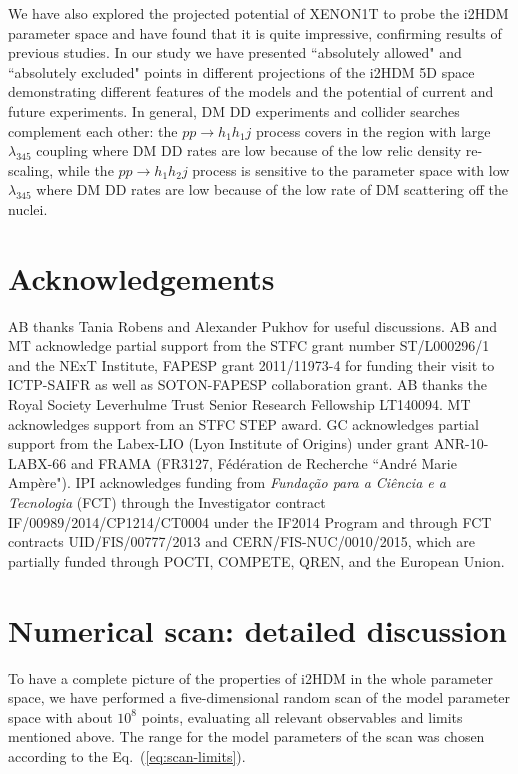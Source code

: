 \documentclass[12pt,a4paper]{article}
\begin{document}
We have also explored the projected potential of XENON1T to probe the i2HDM
parameter space and have found that it is quite impressive,
confirming results of previous studies.
In our study we have presented  ``absolutely allowed"  and ``absolutely excluded" points
in different projections of the i2HDM 5D space demonstrating different features of the models
and the potential of current and future experiments.
In general, DM DD experiments and collider searches complement each other:
the $pp\to h_1 h_1j$ process covers in the region with large $\lambda_{345}$ coupling
where DM DD rates are low because of the low relic density re-scaling,
while the $pp\to h_1 h_2j$ process is sensitive to the parameter space with low $\lambda_{345}$
where DM DD rates are low because of the low rate of DM scattering off the nuclei.

\section*{Acknowledgements}

AB thanks Tania Robens and Alexander Pukhov for useful discussions.
AB and MT acknowledge partial support from the STFC grant number  ST/L000296/1
and the NExT Institute, FAPESP grant 2011/11973-4 for funding their visit to ICTP-SAIFR as well as SOTON-FAPESP collaboration grant.
AB thanks the Royal Society Leverhulme Trust Senior Research Fellowship LT140094.
MT acknowledges support from an STFC STEP award. 
GC acknowledges partial support from the Labex-LIO (Lyon Institute of Origins) under grant ANR-10-LABX-66 and FRAMA (FR3127, F\'ed\'eration de Recherche ``Andr\'e Marie Amp\`ere").
IPI acknowledges funding from \textit{Fun\-da\-\c{c}\~{a}o para a Ci\^{e}ncia e a Tecnologia} (FCT)
through the Investigator contract IF/00989/2014/CP1214/CT0004
under the IF2014 Program and through FCT contracts UID/FIS/00777/2013 and CERN/FIS-NUC/0010/2015,
which are partially funded through POCTI, COMPETE, QREN, and the European Union. 

\appendix

\section{Numerical scan: detailed discussion} \label{app:numerical}

To have a complete picture of the properties of i2HDM in the whole parameter space, we have performed a
five-dimensional random scan of the model parameter space with about $10^8$ points, evaluating all relevant
observables and limits mentioned above. The range for 
the model parameters of the scan was chosen according to the Eq.~(\ref{eq:scan-limits}).
\end{document}
